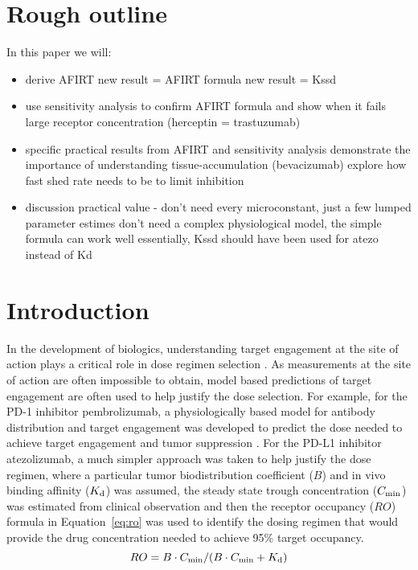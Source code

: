 \section{Rough outline}

In this paper we will:
\begin{itemize}
\item derive AFIRT
\subitem new result = AFIRT formula
\subitem new result = Kssd
\item use sensitivity analysis to confirm AFIRT formula and show when it fails
\subitem large receptor concentration (herceptin = trastuzumab)
\item specific practical results from AFIRT and sensitivity analysis
\subitem demonstrate the importance of understanding tissue-accumulation (bevacizumab)
\subitem explore how fast shed rate needs to be to limit inhibition
\item discussion
\subitem practical value - don't need every microconstant, just a few lumped parameter estimes
\subitem don't need a complex physiological model, the simple formula can work well
\subitem essentially, Kssd should have been used for atezo instead of Kd
\end{itemize}


\section{Introduction}
In the development of biologics, understanding target engagement at the site of action plays a critical role in dose regimen selection \cite{wang16}.  As measurements at the site of action are often impossible to obtain, model based predictions of target engagement are often used to help justify the dose selection.  For example, for the PD-1 inhibitor pembrolizumab, a physiologically based model for antibody distribution and target engagement was developed to predict the dose needed to achieve target engagement and tumor suppression \cite{lindauer17}.  For the PD-L1 inhibitor atezolizumab, a much simpler approach was taken to help justify the dose regimen, where a particular tumor biodistribution coefficient ($B$) and in vivo binding affinity ($K_\text{d}$) was assumed, the steady state trough concentration ($C_\text{min}$) was estimated from clinical observation and then the receptor occupancy ($RO$) formula in Equation~\ref{eq:ro} was used to identify the dosing regimen that would provide the drug concentration needed to achieve 95\% target occupancy.
\begin{equation}
RO = B\cdot C_\text{min}/(B\cdot C_\text{min}+K_\text{d})
\label{eq:ro}
\end{equation}

